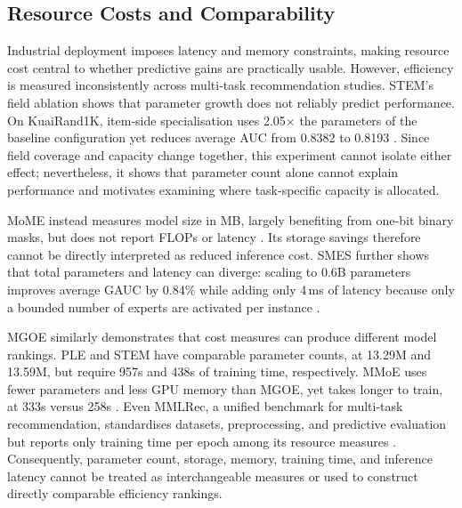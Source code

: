 \subsection{Resource Costs and Comparability}
Industrial deployment imposes latency and memory constraints, making resource cost central to whether predictive gains are practically usable. However, efficiency is measured inconsistently across multi-task recommendation studies. STEM's field ablation shows that parameter growth does not reliably predict performance. On KuaiRand1K, item-side specialisation uses 2.05$\times$ the parameters of the baseline configuration yet reduces average AUC from 0.8382 to 0.8193 \citep{Su2024STEM}. Since field coverage and capacity change together, this experiment cannot isolate either effect; nevertheless, it shows that parameter count alone cannot explain performance and motivates examining where task-specific capacity is allocated.


MoME instead measures model size in MB, largely benefiting from one-bit binary masks, but does not report FLOPs or latency \citep{Xu2024MoME}. Its storage savings therefore cannot be directly interpreted as reduced inference cost. SMES further shows that total parameters and latency can diverge: scaling to 0.6B parameters improves average GAUC by 0.84\% while adding only 4\,ms of latency because only a bounded number of experts are activated per instance \citep{Zhang2026SMES}.

MGOE similarly demonstrates that cost measures can produce different model rankings. PLE and STEM have comparable parameter counts, at 13.29M and 13.59M, but require 957s and 438s of training time, respectively. MMoE uses fewer parameters and less GPU memory than MGOE, yet takes longer to train, at 333s versus 258s \citep{Yao2026MGOE}. Even MMLRec, a unified benchmark for multi-task recommendation, standardises datasets, preprocessing, and predictive evaluation but reports only training time per epoch among its resource measures \citep{yuan2024mmlrec}. Consequently, parameter count, storage, memory, training time, and inference latency cannot be treated as interchangeable measures or used to construct directly comparable efficiency rankings.
 



